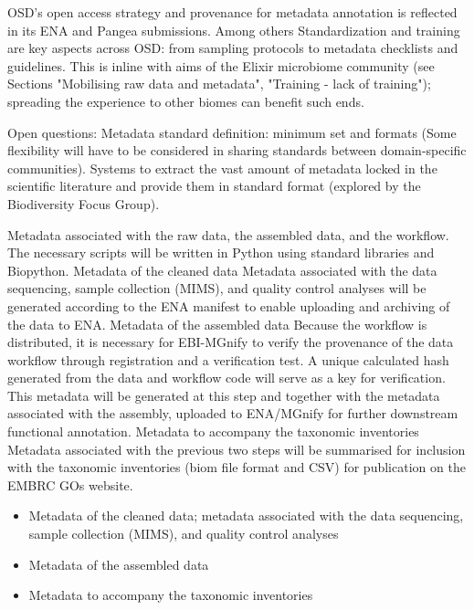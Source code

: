    OSD’s open access strategy and provenance for metadata annotation is reflected in its ENA and Pangea submissions. 
   Among others Standardization and training are key aspects across OSD: from sampling protocols to metadata checklists and guidelines. 
   This is inline with aims of the Elixir microbiome community (see Sections "Mobilising raw data and metadata", 
   "Training - lack of training"); 
   spreading the experience to other biomes can benefit such ends.


   Open questions: 
   Metadata standard definition: minimum set and formats (Some flexibility will have to be considered in sharing standards between domain-specific communities).
   Systems to extract the vast amount of metadata locked in the scientific literature and provide them in standard format (explored by the Biodiversity Focus Group).


   Metadata associated with the raw data, the assembled data, and the workflow. The necessary scripts will be written in Python using standard libraries and Biopython. 
   Metadata of the cleaned data
   Metadata associated with the data sequencing, sample collection (MIMS), and quality control analyses will be generated according to the ENA manifest to enable uploading and archiving of the data to ENA.
   Metadata of the assembled data
   Because the workflow is distributed, it is necessary for EBI-MGnify to verify the provenance of the data workflow through registration and a verification test. A unique calculated hash generated from the data and workflow code will serve as a key for verification. This metadata will be generated at this step and together with the metadata associated with the assembly, uploaded to ENA/MGnify for further downstream functional annotation.
   Metadata to accompany the taxonomic inventories
   Metadata associated with the previous two steps will be summarised for inclusion with the taxonomic inventories (biom file format and CSV) for publication on the EMBRC GOs website.


   \begin{itemize}
      \item Metadata of the cleaned data; metadata associated with the data sequencing, sample collection (MIMS), and quality control analyses
      \item Metadata of the assembled data
      \item Metadata to accompany the taxonomic inventories

   \end{itemize}  




